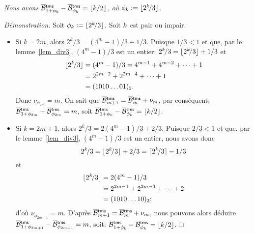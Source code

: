\begin{thm}
\label{thm_OB_lambda}
\textsl{Nous avons \(\OB{\mathsf{tms}}{1+\phi_k} -
  \OB{\mathsf{tms}}{\phi_k} = \floor{k/2}\), où \(\phi_k :=
  \lfloor{2^k\!/3}\rfloor\).}
\end{thm}
\noindent \emph{Démonstration.} Soit \(\phi_k := \lfloor{2^k\!/3}\rfloor\). Soit
\(k\)~est pair ou impair.
\begin{itemize}

  \item Si \(k=2m\), alors \(2^k\!/3 = (4^m-1)/3 + 1/3\). Puisque
    \(1/3<1\) et que, par le lemme~\ref{lem_div3}, \((4^m-1)/3\) est un
    entier: \(2^k\!/3 = \lfloor{2^k\!/3}\rfloor + 1/3\) et
    \begin{align*}
      \lfloor{2^k\!/3}\rfloor &= (4^m-1)/3 = 4^{m-1} + 4^{m-2} + \dots + 1\\
                      &= 2^{2m-2} + 2^{2m-4} + \dots + 1\\
                      &= (1010\dots01)_2.
    \end{align*}
    Donc \(\nu_{\phi_{2m}} = m\). On sait que \(\OB{\fun{tms}}{m+1} =
    \OB{\fun{tms}}{m} + \nu_m\), par conséquent:
    \(\OB{\fun{tms}}{1+\phi_{2m}} - \OB{\fun{tms}}{\phi_{2m}} = m\),
    soit \(\OB{\fun{tms}}{1+\phi_k} - \OB{\fun{tms}}{\phi_k} =
    \floor{k/2}\).

  \item Si \(k=2m+1\), alors \(2^k\!/3 = 2(4^m\!-\!1)/3 + 2/3\). Puisque
    \(2/3\!<\!1\) et que, par le lemme~\ref{lem_div3},
    \((4^m-1)/3\) est un entier, nous avons donc
    \begin{equation*}
      2^k\!/3 = \lfloor{2^k\!/3}\rfloor + 2/3 = \lceil{2^k\!/3}\rceil - 1/3
    \end{equation*}
    et
    \begin{align*}
      \lfloor{2^k\!/3}\rfloor &= 2(4^m-1)/3\\
                      &= 2^{2m-1} + 2^{2m-3} + \dots + 2\\
                      &= (1010\dots10)_2;
    \end{align*}
    d'où \(\nu_{\phi_{2m+1}} = m\). D'après \(\OB{\fun{tms}}{m+1} =
    \OB{\fun{tms}}{m} + \nu_m\), nous pouvons alors déduire
    \(\OB{\fun{tms}}{1+\phi_{2m+1}} - \OB{\fun{tms}}{\phi_{2m+1}} =
    m\), soit:
    \(\OB{\fun{tms}}{1+\phi_k} - \OB{\fun{tms}}{\phi_k} =
    \floor{k/2}\).\hfill\(\Box\)

\end{itemize}

\bigskip


